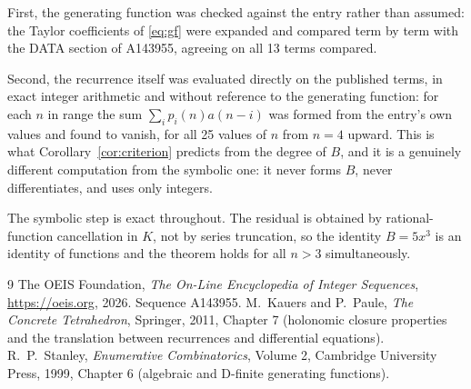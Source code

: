 \documentclass[11pt,a4paper]{article}
\theoremstyle{plain}
\theoremstyle{definition}
\begin{document}
First, the generating function was checked against the entry rather than assumed: the
Taylor coefficients of \eqref{eq:gf} were expanded and compared term by term with the DATA
section of A143955, agreeing on all 13 terms compared.

Second, the recurrence itself was evaluated directly on the published terms, in exact
integer arithmetic and without reference to the generating function: for each $n$ in range
the sum $\sum_{i}p_{i}(n)a(n-i)$ was formed from the entry's own values and found to
vanish, for all 25 values of $n$ from $n=4$ upward. This is what
Corollary~\ref{cor:criterion} predicts from the degree of $B$, and it is a genuinely
different computation from the symbolic one: it never forms $B$, never differentiates, and
uses only integers.

The symbolic step is exact throughout. The residual is obtained by rational-function
cancellation in $K$, not by series truncation, so the identity $B=5 x^{3}$ is an
identity of functions and the theorem holds for all $n>3$ simultaneously.

\begin{thebibliography}{9}
 The OEIS Foundation, \emph{The On-Line Encyclopedia of Integer Sequences},
\url{https://oeis.org}, 2026. Sequence A143955.
 M.~Kauers and P.~Paule, \emph{The Concrete Tetrahedron}, Springer, 2011,
Chapter 7 (holonomic closure properties and the translation between recurrences and
differential equations).
 R.~P.~Stanley, \emph{Enumerative Combinatorics}, Volume 2, Cambridge
University Press, 1999, Chapter 6 (algebraic and D-finite generating functions).
\end{thebibliography}
\end{document}

